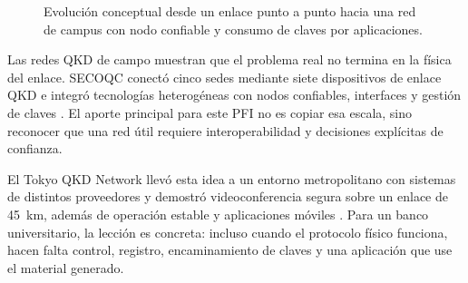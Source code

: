 \begin{figure}[H]
  \centering
  \caption{Evolución conceptual desde un enlace punto a punto hacia una red de campus con nodo confiable y consumo de claves por aplicaciones.}
  \label{fig:red_qkd_conceptual}
\end{figure}

Las redes QKD de campo muestran que el problema real no termina en la física del enlace. SECOQC conectó cinco sedes mediante siete dispositivos de enlace QKD e integró tecnologías heterogéneas con nodos confiables, interfaces y gestión de claves \cite{peev2009secoqc}. El aporte principal para este PFI no es copiar esa escala, sino reconocer que una red útil requiere interoperabilidad y decisiones explícitas de confianza.

El Tokyo QKD Network llevó esta idea a un entorno metropolitano con sistemas de distintos proveedores y demostró videoconferencia segura sobre un enlace de \SI{45}{\kilo\meter}, además de operación estable y aplicaciones móviles \cite{sasaki2011tokyo}. Para un banco universitario, la lección es concreta: incluso cuando el protocolo físico funciona, hacen falta control, registro, encaminamiento de claves y una aplicación que use el material generado.

